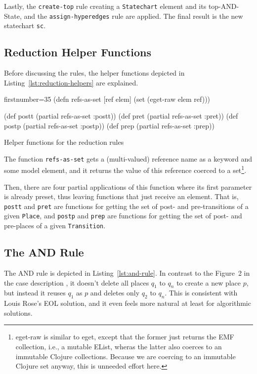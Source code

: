 \documentclass[11pt]{article}
\begin{document}
Lastly, the \verb|create-top| rule creating a \verb|Statechart| element and its
top-AND-State, and the \verb|assign-hyperedges| rule are applied.  The final
result is the new statechart \verb|sc|.


\subsection{Reduction Helper Functions}
\label{sec:reduct-help-functions}

Before discussing the rules, the helper functions depicted in
Listing~\ref{lst:reduction-helpers} are explained.

\begin{listing}[H]
  \begin{clojurecode*}{firstnumber=35}
(defn refs-as-set [ref elem]
  (set (eget-raw elem ref)))

(def postt (partial refs-as-set :postt))
(def pret  (partial refs-as-set :pret))
(def postp (partial refs-as-set :postp))
(def prep  (partial refs-as-set :prep))
  \end{clojurecode*}
  \label{lst:reduction-helpers}
  \caption{Helper functions for the reduction rules}
\end{listing}

The function \verb|refs-as-set| gets a (multi-valued) reference name as a
keyword and some model element, and it returns the value of this reference
coerced to a set\footnote{\textsf{eget-raw} is similar to \textsf{eget}, except
  that the former just returns the EMF collection, i.e., a mutable
  \textsf{EList}, wheras the latter also coerces to an immutable Clojure
  collections.  Because we are coercing to an immutable Clojure set anyway,
  this is unneeded effort here.}.

Then, there are four partial applications of this function where its first
parameter is already preset, thus leaving functions that just receive an
element.  That is, \verb|postt| and \verb|pret| are functions for getting the
set of post- and pre-transitions of a given \verb|Place|, and \verb|postp| and
\verb|prep| are functions for getting the set of post- and pre-places of a
given \verb|Transition|.

\subsection{The AND Rule}
\label{sec:and-rule}

The AND rule is depicted in Listing~\ref{lst:and-rule}.  In contrast to the
Figure~2 in the case description \cite{pn2sccasedesc}, it doesn't delete all
places $q_1$ to $q_n$ to create a new place $p$, but instead it reuses $q_1$ as
$p$ and deletes only $q_2$ to $q_n$.  This is consistent with Louis Rose's EOL
solution, and it even feels more natural at least for algorithmic solutions.
\end{document}
